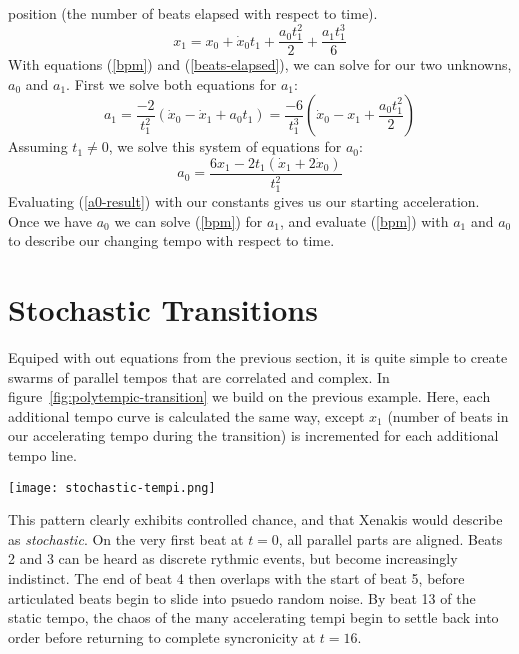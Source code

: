 position (the number of beats elapsed with respect to time).
\begin{equation}
	\label{beats-elapsed}
	x_1 = x_0 + \dot{x}_0t_1 + \frac{a_0t_1^2}{2} + \frac{a_1t_1^3}{6}
\end{equation}
With equations (\ref{bpm}) and (\ref{beats-elapsed}), we can solve for our 
two unknowns, $a_0$ and $a_1$. First we solve both equations for $a_1$:
\begin{displaymath}
    \label{a1-solution}
    a_1=
    \frac{-2}{t_1^2}(\dot{x}_0-\dot{x}_1 + a_0t_1)=
    \frac{-6}{t_1^3}(\dot{x}_0-x_1 + \frac{a_0t_1^2}{2})
\end{displaymath}
Assuming $t_1 \neq 0$, we solve this system of equations for $a_0$:
\begin{equation}
	\label{a0-result}
	a_0=\frac{6x_1-2t_1(\dot{x}_1+2\dot{x}_0)}{t_1^2}
\end{equation}
Evaluating (\ref{a0-result}) with our constants gives us our starting
acceleration. Once we have $a_0$ we can solve (\ref{bpm}) for $a_1$, and 
evaluate (\ref{bpm}) with $a_1$ and $a_0$ to describe our changing tempo 
with respect to time.

\section{Stochastic Transitions}
\label{sec:polytempic-implementation}
Equiped with out equations from the previous section, it is quite
simple to create swarms of parallel tempos that are correlated and
complex. In figure~\ref{fig:polytempic-transition} we build on the
previous example. Here, each additional tempo curve is calculated the
same way, except $x_1$ (number of beats in our accelerating tempo
during the transition) is incremented for each additional tempo line. 
\begin{figure*}[h!]
  \texttt{[image: stochastic-tempi.png]}
  \caption{Stochastic Tempo Transition from 90~BPM to 120~BPM. Black
    dots are beats in our changing tempi. Grey dots show a
    continuation of beats at the initial tempo.
    $12 \leq x_1 \leq 20$}
  \label{fig:polytempic-transition}
\end{figure*}\hfill\break
This pattern clearly exhibits controlled chance, and that Xenakis
would describe as \emph{stochastic}. On the very first beat at $t=0$,
all parallel parts are aligned. Beats 2 and 3 can be heard as discrete
rythmic events, but become increasingly indistinct. The end of beat 4
then overlaps with the start of beat 5, before articulated beats begin
to slide into psuedo random noise. By beat 13 of the static tempo, the
chaos of the many accelerating tempi begin to settle back into order
before returning to complete syncronicity at $t=16$.

